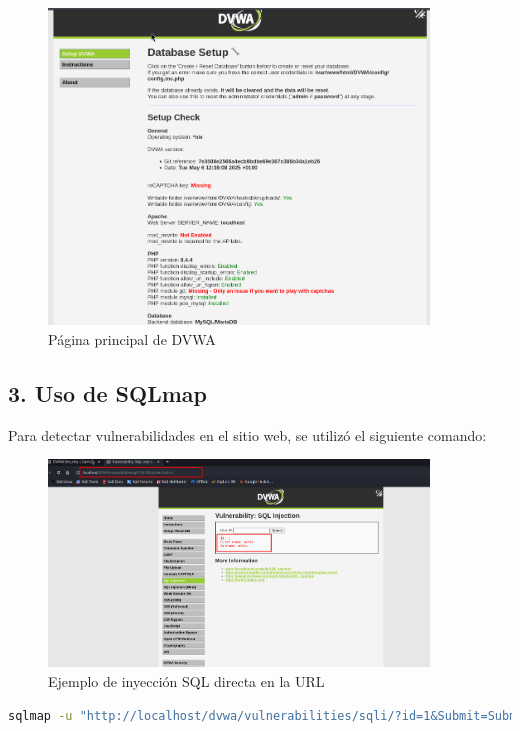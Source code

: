 \documentclass[12pt,a4paper]{article}
\begin{document}
\begin{figure}[H]
    \centering
    \includegraphics[width=0.9\textwidth]{dvwa_page.png}
    \caption{Página principal de DVWA}
    \label{fig:dvwa}
\end{figure}

\subsection{3. Uso de SQLmap}
Para detectar vulnerabilidades en el sitio web, se utilizó el siguiente comando:

\begin{figure}[H]
    \centering
    \includegraphics[width=0.9\textwidth]{id_1.png}
    \caption{Ejemplo de inyección SQL directa en la URL}
    \label{fig:id_1}
\end{figure}

\begin{lstlisting}[language=bash, caption=Uso básico de SQLmap]
sqlmap -u "http://localhost/dvwa/vulnerabilities/sqli/?id=1&Submit=Submit" --batch --threads=10
\end{lstlisting}
\end{document}

